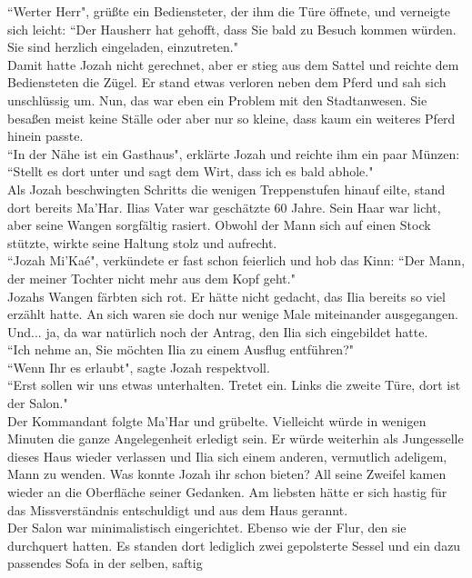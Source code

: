  ``Werter Herr", grüßte ein Bediensteter, der ihm die Türe öffnete, und verneigte sich leicht:  
``Der Hausherr hat gehofft, dass Sie bald zu Besuch kommen würden. Sie sind herzlich eingeladen, 
einzutreten."\\
Damit hatte Jozah nicht gerechnet, aber er stieg aus dem Sattel und reichte dem Bediensteten die 
Zügel. Er stand etwas verloren neben dem Pferd und sah sich unschlüssig um. Nun, das war eben ein 
Problem mit den Stadtanwesen. Sie besaßen meist keine Ställe oder aber nur so kleine, dass kaum ein 
weiteres Pferd hinein passte.\\
 ``In der Nähe ist ein Gasthaus", erklärte Jozah und reichte ihm ein paar Münzen:  ``Stellt es dort 
unter und sagt dem Wirt, dass ich es bald abhole."\\
Als Jozah beschwingten Schritts die wenigen Treppenstufen hinauf eilte, stand dort bereits 
Ma'Har. Ilias Vater war geschätzte 60 Jahre. Sein Haar war licht, aber seine Wangen sorgfältig 
rasiert. Obwohl der Mann sich auf einen Stock stützte, wirkte seine Haltung stolz und aufrecht.\\
 ``Jozah Mi'Kaé", verkündete er fast schon feierlich und hob das Kinn:  ``Der Mann, der meiner 
Tochter nicht mehr aus dem Kopf geht."\\
Jozahs Wangen färbten sich rot. Er hätte nicht gedacht, das Ilia bereits so viel erzählt hatte. An 
sich waren sie doch nur wenige Male miteinander ausgegangen. Und... ja, da war natürlich noch der 
Antrag, den Ilia sich eingebildet hatte. \\
 ``Ich nehme an, Sie möchten Ilia zu einem Ausflug entführen?"\\
 ``Wenn Ihr es erlaubt", sagte Jozah respektvoll.\\
 ``Erst sollen wir uns etwas unterhalten. Tretet ein. Links die zweite Türe, dort ist der Salon."\\
Der Kommandant folgte Ma'Har und grübelte. Vielleicht würde in wenigen Minuten die ganze 
Angelegenheit erledigt sein. Er würde weiterhin als Jungesselle dieses Haus wieder verlassen und 
Ilia sich einem anderen, vermutlich adeligem, Mann zu wenden. Was konnte Jozah ihr schon bieten? 
All seine Zweifel kamen wieder an die Oberfläche seiner Gedanken. Am liebsten hätte er sich hastig 
für das Missverständnis entschuldigt und aus dem Haus gerannt.\\
Der Salon war minimalistisch eingerichtet. Ebenso wie der Flur, den sie durchquert hatten. Es 
standen dort lediglich zwei gepolsterte Sessel und ein dazu passendes Sofa in der selben, saftig 
